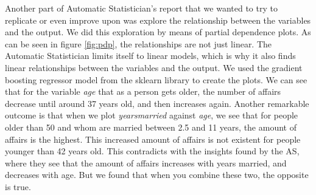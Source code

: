 \documentclass[a4paper, 10pt, conference]{ieeeconf}
\begin{document}
Another part of Automatic Statistician's report that we wanted to try to replicate or even improve upon was explore the relationship between the variables and the output. We did this exploration by means of partial dependence plots. As can be seen in figure \ref{fig:pdp}, the relationships are not just linear. The Automatic Statistician limits itself to linear models, which is why it also finds linear relationships between the variables and the output. We used the gradient boosting regressor model from the sklearn library \cite{scikit-learn} to create the plots. We can see that for the variable \textit{age} that as a person gets older, the number of affairs decrease until around 37 years old, and then increases again. Another remarkable outcome is that when we plot \textit{yearsmarried} against \textit{age}, we see that for people older than 50 and whom are married between 2.5 and 11 years, the amount of affairs is the highest. This increased amount of affairs is not existent for people younger than 42 years old. This contradicts with the insights found by the AS, where they see that the amount of affairs increases with years married, and decreases with age. But we found that when you combine these two, the opposite is true.
\end{document}
